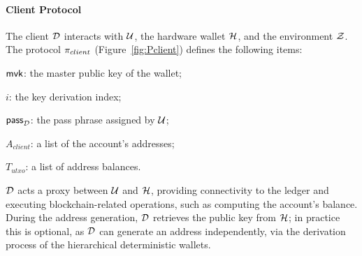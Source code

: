 \paragraph{Client Protocol} \label{subsec:client-protocol}
The client $\mathcal{D}$ interacts with $\mathcal{U}$, the hardware wallet $\mathcal{H}$,
and the environment $\mathcal{Z}$. The protocol $\pi_{client}$ (Figure~\ref{fig:Pclient})
defines the following items:
\begin{inparaenum}[i)]
    \item $\mathsf{mvk}$: the master public key of the wallet;
    \item $i$: the key derivation index;
    \item $\mathsf{pass}_{\mathcal{D}}$: the pass phrase assigned by $\mathcal{U}$;
    \item $A_{client}$: a list of the account's addresses;
    \item $T_{utxo}$: a list of address balances.
\end{inparaenum}
$\mathcal{D}$ acts a proxy between $\mathcal{U}$ and $\mathcal{H}$, providing connectivity
to the ledger and executing blockchain-related operations, such as computing
the account's balance. During the address generation, $\mathcal{D}$ retrieves the
public key from $\mathcal{H}$; in practice this is optional, as $\mathcal{D}$ can
generate an address independently, via the derivation process of the
hierarchical deterministic wallets.


